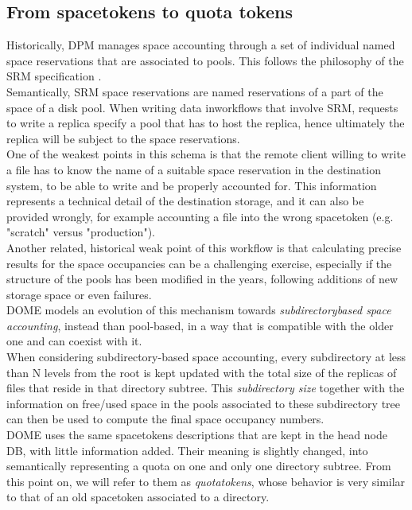 \documentclass[a4paper]{jpconf}
\begin{document}
\subsection{From spacetokens to quota tokens}
Historically, DPM manages space accounting through a set of individual named space reservations that are associated to pools. This follows the
philosophy of the SRM specification \cite{BIB}.\\
Semantically, SRM space reservations are named reservations of a part of the space of a disk pool. When  writing data
inworkflows that involve SRM, requests to write a replica specify a pool
that has to host the replica, hence ultimately the replica will be subject to the space reservations.\\

One of the weakest points in this schema is that the remote client willing to write a file
has to know the name of a suitable space reservation in the destination system, to be able to write
and be properly accounted for. This information represents a technical detail
of the destination storage, and it can also  be provided wrongly, for example accounting
a file into the wrong spacetoken (e.g. "scratch" versus "production").\\

Another related, historical weak point of this workflow is that calculating precise results for the space occupancies can be a challenging exercise,
especially if the structure of the pools has been modified in the years, following additions of new storage space or
even failures.\\
DOME models an evolution of this mechanism towards \textit{subdirectory\-based space accounting}, instead than pool-based, in a way
that is compatible with the older one and can coexist with it.\\

When considering subdirectory-based space accounting, every subdirectory at less than N levels from the root is kept
updated with the total size of the replicas of files that reside in that directory subtree.
This \textit{subdirectory size} together with the information on free/used space in the pools associated to these subdirectory tree
can then be used to compute the final space occupancy numbers.\\

DOME uses the same spacetokens descriptions that are kept in the head node DB, with little information added. Their meaning is slightly changed,
into semantically representing a quota on one and only one directory subtree. From this point on, we will refer to them as \textit{quotatokens},
whose behavior is very similar to that of an old spacetoken associated to a directory.\\
\end{document}
